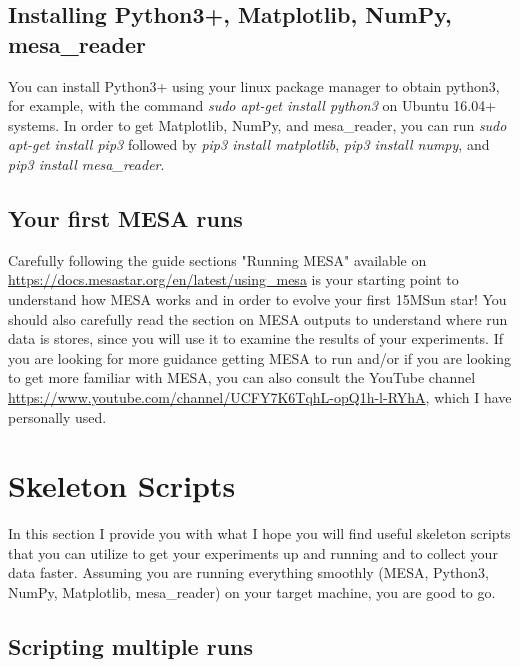\documentclass[12pt,hidelinks]{article}
\begin{document}
	\subsection{Installing Python3+, Matplotlib, NumPy, mesa\_reader}
	        You can install Python3+ using your linux package manager to obtain python3, for example, with the command \emph{sudo apt-get install python3} on Ubuntu 16.04+ systems. In order to get Matplotlib, NumPy, and mesa\_reader, you can run \emph{sudo apt-get install pip3} followed by \emph{pip3 install matplotlib}, \emph{pip3 install numpy}, and \emph{pip3 install mesa\_reader}.
	        
	 \subsection{Your first MESA runs}
	        Carefully following the guide sections "Running MESA" available on \url{https://docs.mesastar.org/en/latest/using\_mesa} is your starting point to understand how MESA works and in order to evolve your first 15MSun star! You should also carefully read the section on MESA outputs to understand where run data is stores, since you will use it to examine the results of your experiments. If you are looking for more guidance getting MESA to run and/or if you are looking to get more familiar with MESA, you can also consult the YouTube channel \url{https://www.youtube.com/channel/UCFY7K6TqhL-opQ1h-l-RYhA}, which I have personally used.
\newpage
\section{Skeleton Scripts}
\vspace{10.5cm}
In this section I provide you with what I hope you will find useful skeleton scripts that you can utilize to get your experiments up and running and to collect your data faster. Assuming you are running everything smoothly (MESA, Python3, NumPy, Matplotlib, mesa\_reader) on your target machine, you are good to go. 

	\subsection{Scripting multiple runs} 
	    
\end{document}
